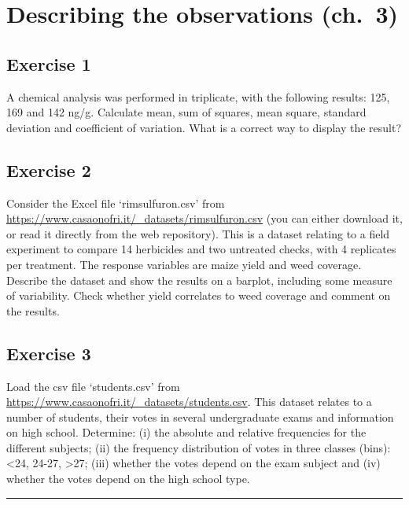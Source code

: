 \documentclass[a4paper,12pt,oneside]{book}
\begin{document}
\hypertarget{describing-the-observations-ch.-3}{%
\section{Describing the observations (ch.~3)}\label{describing-the-observations-ch.-3}}

\hypertarget{exercise-1-1}{%
\subsection{Exercise 1}\label{exercise-1-1}}

A chemical analysis was performed in triplicate, with the following results: 125, 169 and 142 ng/g. Calculate mean, sum of squares, mean square, standard deviation and coefficient of variation. What is a correct way to display the result?

\hypertarget{exercise-2-1}{%
\subsection{Exercise 2}\label{exercise-2-1}}

Consider the Excel file `rimsulfuron.csv' from \url{https://www.casaonofri.it/_datasets/rimsulfuron.csv} (you can either download it, or read it directly from the web repository). This is a dataset relating to a field experiment to compare 14 herbicides and two untreated checks, with 4 replicates per treatment. The response variables are maize yield and weed coverage. Describe the dataset and show the results on a barplot, including some measure of variability. Check whether yield correlates to weed coverage and comment on the results.

\hypertarget{exercise-3-1}{%
\subsection{Exercise 3}\label{exercise-3-1}}

Load the csv file `students.csv' from \url{https://www.casaonofri.it/_datasets/students.csv}. This dataset relates to a number of students, their votes in several undergraduate exams and information on high school. Determine: (i) the absolute and relative frequencies for the different subjects; (ii) the frequency distribution of votes in three classes (bins): \textless24, 24-27, \textgreater27; (iii) whether the votes depend on the exam subject and (iv) whether the votes depend on the high school type.

\begin{center}\rule{0.5\linewidth}{0.5pt}\end{center}
\end{document}
